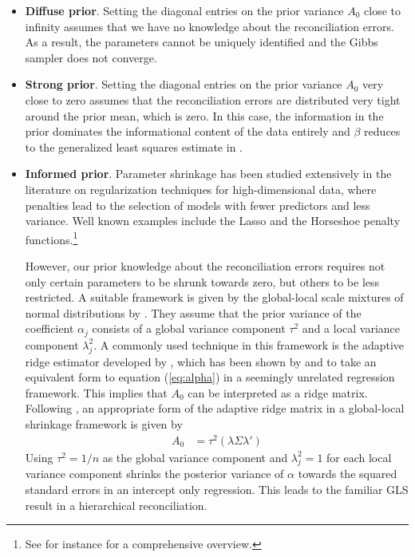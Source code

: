 \documentclass[a4paper,fleqn,11pt]{article}
\begin{document}
\begin{itemize}
    \item\textbf{Diffuse prior}. Setting the diagonal entries on the prior variance $A_0$ close to infinity assumes that we have no knowledge about the reconciliation errors. As a result, the parameters cannot be uniquely identified and the Gibbs sampler does not converge.
    \item \textbf{Strong prior}. Setting the diagonal entries on the prior variance $A_0$ very close to zero assumes that the reconciliation errors are distributed very tight around the prior mean, which is zero. In this case, the information in the prior dominates the informational content of the data entirely and $\beta$ reduces to the generalized least squares estimate in \cite{Hyndman2016}. 
    \item \textbf{Informed prior}. Parameter shrinkage has been studied extensively in the literature on regularization techniques for high-dimensional data, where penalties lead to the selection of models with fewer predictors and less variance. Well known examples include the Lasso and the Horseshoe penalty functions.\footnote{See for instance \cite{Piironen2017} for a comprehensive overview.}
    
    However, our prior knowledge about the reconciliation errors requires not only certain parameters to be shrunk towards zero, but others to be less restricted. A suitable framework is given by the global-local scale mixtures of normal distributions by \cite{Polson2010}. They assume that the prior variance of the coefficient $\alpha_j$ consists of a global variance component $\tau^2$ and a local variance component $\lambda_j^2$. A commonly used technique in this framework is the adaptive ridge estimator developed by \cite{Brown1980}, which has been shown by \cite{Firinguetti1997} and \cite{Haitovsky1987} to take an equivalent form to equation (\ref{eq:alpha}) in a seemingly unrelated regression framework. This implies that $A_0$ can be interpreted as a ridge matrix. Following \cite{Polson2010}, an appropriate form of the adaptive ridge matrix in a global-local shrinkage framework is given by
    \begin{align*}
	A_0 &= \tau^{2}(\lambda \Sigma \lambda')
    \end{align*}
    Using $\tau^2 = 1/n$ as the global variance component and $\lambda_j^2 = 1$ for each local variance component shrinks the posterior variance of $\alpha$ towards the squared standard errors in an intercept only regression. This leads to the familiar GLS result in a hierarchical reconciliation.
    

\end{itemize}
\end{document}
